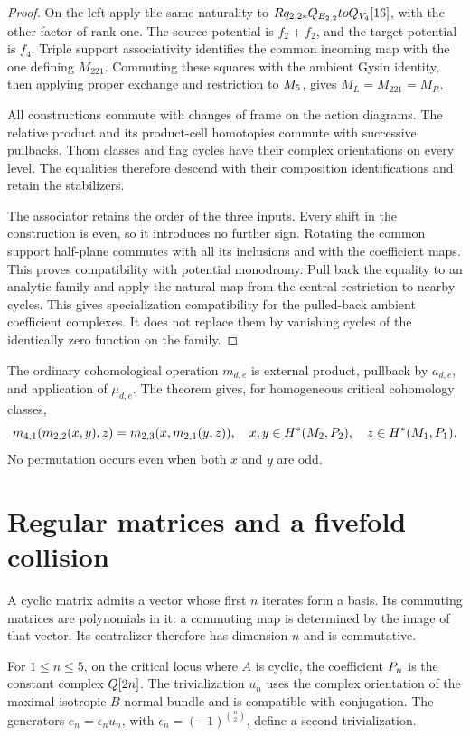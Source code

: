 \begin{proof}
On the left apply the same naturality to
$Rq_{2,2*}Q_{E_{2,2}}toQ_{V_4}[16]$, with the other factor
of rank one. The source potential is $f_2+f_2$, and the target
potential is $f_4$. Triple support associativity identifies the
common incoming map with the one defining $M_{221}$.
Commuting these squares with the ambient Gysin identity, then
applying proper exchange and restriction to $M_5$, gives
$M_L=M_{221}=M_R$.

All constructions commute with changes of frame on the action
diagrams. The relative product and its product-cell homotopies
commute with successive pullbacks. Thom classes and flag cycles
have their complex orientations on every level. The equalities
therefore descend with their composition identifications and
retain the stabilizers.

The associator retains the order of the three inputs. Every shift
in the construction is even, so it introduces no further sign.
Rotating the common support half-plane commutes with all its
inclusions and with the coefficient maps. This proves compatibility
with potential monodromy. Pull back the equality to an analytic
family and apply the natural map from the central restriction to
nearby cycles. This gives specialization compatibility for the
pulled-back ambient coefficient complexes. It does not replace them
by vanishing cycles of the identically zero function on the family.
\end{proof}

The ordinary cohomological operation $m_{d,e}$ is external product,
pullback by $a_{d,e}$, and application of $\mu_{d,e}$.
The theorem gives, for homogeneous critical cohomology classes,
\[
 m_{4,1}(m_{2,2}(x,y),z)=m_{2,3}(x,m_{2,1}(y,z)),
 \quad x,y\in H^*(M_2,P_2),\quad
 z\in H^*(M_1,P_1).
\]
No permutation occurs even when both $x$ and $y$ are odd.

\section{Regular matrices and a fivefold collision}
\label{fl221:sec:cyclic}

A cyclic matrix admits a vector whose first $n$ iterates form a
basis. Its commuting matrices are polynomials in it: a commuting
map is determined by the image of that vector. Its centralizer
therefore has dimension $n$ and is commutative.

\begin{lemma}
\label{fl221:lem:cyclic}
For $1\le n\le5$, on the critical locus where $A$ is cyclic,
the coefficient $P_n$ is the constant complex $Q[2n]$.
The trivialization $u_n$ uses the complex orientation of the
maximal isotropic $B$ normal bundle and is compatible with conjugation.
The generators $e_n=\epsilon_nu_n$, with
$\epsilon_n=(-1)^{\binom n2}$, define a second trivialization.
\end{lemma}

